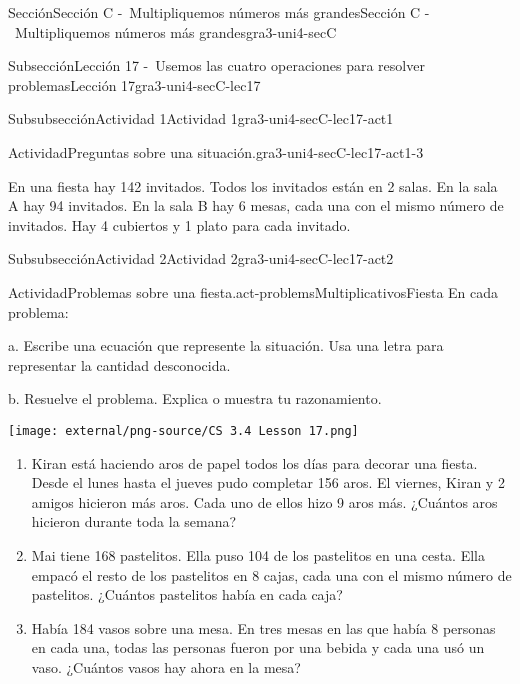 \documentclass[twoside,14pt,]{extarticle}
\begin{document}
\begin{sectionptx}{Sección}{Sección C -~Multipliquemos números más grandes}{}{Sección C -~Multipliquemos números más grandes}{}{}{gra3-uni4-secC}
\begin{subsectionptx}{Subsección}{Lección 17 -~Usemos las cuatro operaciones para resolver problemas}{}{Lección 17}{}{}{gra3-uni4-secC-lec17}
\begin{subsubsectionptx}{Subsubsección}{Actividad 1}{}{Actividad 1}{}{}{gra3-uni4-secC-lec17-act1}
\begin{activity}{Actividad}{Preguntas sobre una situación.}{gra3-uni4-secC-lec17-act1-3}
\par
En una fiesta hay 142 invitados. Todos los invitados están en 2 salas. En la sala A hay 94 invitados. En la sala B hay 6 mesas, cada una con el mismo número de invitados. Hay 4 cubiertos y 1 plato para cada invitado.%
\end{activity}%
\end{subsubsectionptx}
%
%
\typeout{************************************************}
\typeout{************************************************}
%
\begin{subsubsectionptx}{Subsubsección}{Actividad 2}{}{Actividad 2}{}{}{gra3-uni4-secC-lec17-act2}
\begin{activity}{Actividad}{Problemas sobre una fiesta.}{act-problemsMultiplicativosFiesta}%
En cada problema:%
\begin{sidebyside}{2}{0}{0}{0}%
\begin{sbspanel}{0.6}%
a. Escribe una ecuación que represente la situación. Usa una letra para representar la cantidad desconocida.%
\par
b. Resuelve el problema. Explica o muestra tu razonamiento.%
\end{sbspanel}%
\begin{sbspanel}{0.4}%
\texttt{[image: external/png-source/CS 3.4 Lesson 17.png]}
\end{sbspanel}%
\end{sidebyside}%
%
\begin{enumerate}
\item{}Kiran está haciendo aros de papel todos los días para decorar una fiesta. Desde el lunes hasta el jueves pudo completar 156 aros. El viernes, Kiran y 2 amigos hicieron más aros. Cada uno de ellos hizo 9 aros más. ¿Cuántos aros hicieron durante toda la semana?%
\item{}Mai tiene 168 pastelitos. Ella puso 104 de los pastelitos en una cesta. Ella empacó el resto de los pastelitos en 8 cajas, cada una con el mismo número de pastelitos. ¿Cuántos pastelitos había en cada caja?%
\item{}Había 184 vasos sobre una mesa. En tres mesas en las que había 8 personas en cada una, todas las personas fueron por una bebida y cada una usó un vaso. ¿Cuántos vasos hay ahora en la mesa?%
\end{enumerate}
\end{activity}%
\end{subsubsectionptx}
%
%
\typeout{************************************************}

\end{subsectionptx}
\end{sectionptx}
\end{document}
